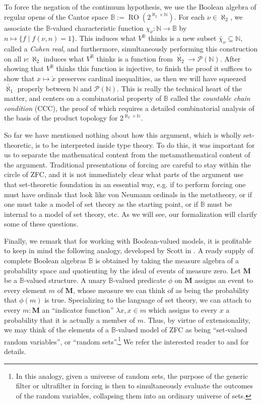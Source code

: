 \documentclass[a4paper,USenglish,cleveref, autoref]{lipics-v2019}
\newcommand{\B}{\mathbb{B}}
\begin{document}
To force the negation of the continuum hypothesis, we use the Boolean algebra of regular opens of the Cantor space $\B := \operatorname{RO}(2^{\aleph_2 \times \mathbb{N}})$. For each $\nu \in \aleph_2$, we associate the $\B$-valued characteristic function $\chi_\nu : \mathbb{N} \to \B$ by $n \mapsto \{f \operatorname{|} f(\nu, n) = 1\}$. This induces what $V^\B$ thinks is a new subset $\widetilde{\chi_{\nu}} \subseteq \mathbb{N}$, called a \emph{Cohen real}, and furthermore, simultaneously performing this construction on all $\nu : \aleph_2$ induces what $V^\B$ thinks is a function from $\check{\aleph_2} \to \mathcal{P}(\mathbb{N})$. After showing that $V^\B$ thinks this function is injective, to finish the proof it suffices to show that $x \mapsto \check{x}$ preserves cardinal inequalities, as then we will have squeezed $\check{\aleph_1}$ properly between $\mathbb{N}$ and $\mathcal{P}(\mathbb{N})$. This is really the technical heart of the matter, and centers on a combinatorial property of $\B$ called the \emph{countable chain condition} (CCC), the proof of which requires a detailed combinatorial analysis of the basis of the product topology for $2^{\aleph_2 \times \mathbb{N}}$.

So far we have mentioned nothing about how this argument, which is wholly set-theoretic, is to be interpreted inside type theory. To do this, it was important for us to separate the mathematical content from the metamathematical content of the argument. Traditional presentations of forcing are careful to stay within the circle of ZFC, and it is not immediately clear what parts of the argument use that set-theoretic foundation in an essential way, e.g. if to perform forcing one must have ordinals that look like von Neumann ordinals in the metatheory, or if one must take a model of set theory as the starting point, or if $\B$ must be internal to a model of set theory, etc. As we will see, our formalization will clarify some of these questions.

Finally, we remark that for working with Boolean-valued models, it is profitable to keep in mind the following analogy, developed by Scott in \cite{scott1}. A ready supply of complete Boolean algebras $\B$ is obtained by taking the measure algebra of a probability space and quotienting by the ideal of events of measure zero. Let $\mathbf{M}$ be a $\B$-valued structure. A unary $\B$-valued predicate $\phi$ on $\mathbf{M}$ assigns an event to every element $m$ of $\mathbf{M}$, whose measure we can think of as being the probability that $\phi(m)$ is true. Specializing to the language of set theory, we can attach to every $m : \mathbf{M}$ an ``indicator function'' $\lambda x, x \in m$ which assigns to every $x$ a probability that it is actually a member of $m$. Thus, by virtue of extensionality, we may think of the elements of a $\B$-valued model of ZFC as being ``set-valued random variables'', or ``random sets''.\footnote{In this analogy, given a universe of random sets, the purpose of the generic filter or ultrafilter in forcing is then to simultaneously evaluate the outcomes of the random variables, collapsing them into an ordinary universe of sets.} We refer the interested reader to \cite{scott1} and \cite{moore1} for details.
\end{document}
